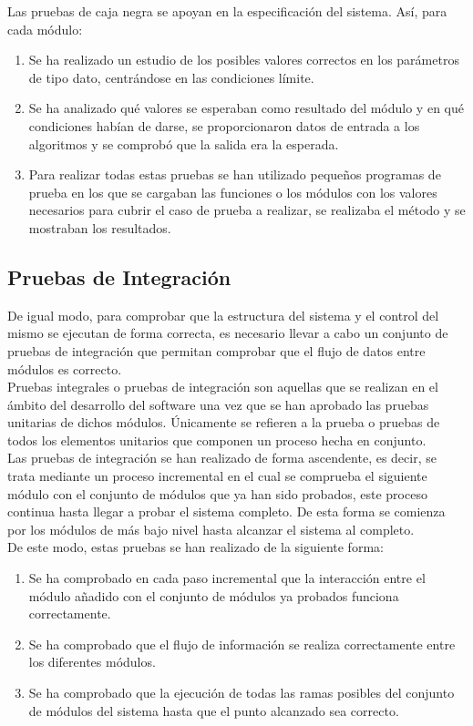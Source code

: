 			Las pruebas de caja negra se apoyan en la especificación del sistema. Así, para cada módulo:
			
			\begin{enumerate}
				\item Se ha realizado un estudio de los posibles valores correctos en los parámetros de tipo dato, centrándose en las condiciones límite.
				\item Se ha analizado qué valores se esperaban como resultado del módulo y en qué condiciones habían de darse, se proporcionaron datos de entrada a los algoritmos y se comprobó que la salida era la esperada.
				\item Para realizar todas estas pruebas se han utilizado pequeños programas de prueba en los que se cargaban las funciones o los módulos con los valores necesarios para cubrir el caso de prueba a realizar, se realizaba el método y se mostraban los resultados.
			\end{enumerate}
		
		\subsection{Pruebas de Integración}

			De igual modo, para comprobar que la estructura del sistema y el control del mismo se ejecutan de forma correcta, es necesario llevar a cabo un conjunto de pruebas de integración que permitan comprobar que el flujo de datos entre módulos es correcto.\\
			
			Pruebas integrales o pruebas de integración son aquellas que se realizan en el ámbito del desarrollo del software una vez que se han aprobado las pruebas unitarias de dichos módulos. Únicamente se refieren a la prueba o pruebas de todos los elementos unitarios que componen un proceso hecha en conjunto.\\
			
			Las pruebas de integración se han realizado de forma ascendente, es decir, se trata mediante un proceso incremental en el cual se comprueba el siguiente módulo con el conjunto de módulos que ya han sido probados, este proceso continua hasta llegar a probar el sistema completo. De esta forma se comienza por los módulos de más bajo nivel hasta alcanzar el sistema al completo.\\
			
			De este modo, estas pruebas se han realizado de la siguiente forma:
			
			\begin{enumerate}
				\item Se ha comprobado en cada paso incremental que la interacción entre el módulo añadido con el conjunto de módulos ya probados funciona correctamente.
				\item Se ha comprobado que el flujo de información se realiza correctamente entre los diferentes módulos.
				\item Se ha comprobado que la ejecución de todas las ramas posibles del conjunto de módulos del sistema hasta que el punto alcanzado sea correcto.
			\end{enumerate}
			

